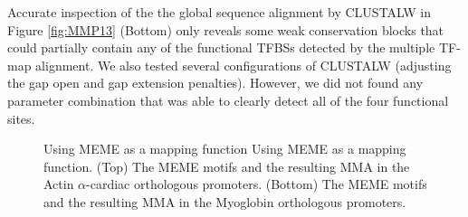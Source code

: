 Accurate inspection of the the global sequence alignment by CLUSTALW in Figure \ref{fig:MMP13} (Bottom)
only reveals some weak conservation blocks that could partially contain any of the functional 
TFBSs detected by the multiple TF-map alignment. We also tested several configurations of 
CLUSTALW (adjusting the gap open and gap extension penalties). However, we did not found any 
parameter combination that was able to clearly detect all of the four functional sites.

\begin{figure}[t!]
\begin{center}
\setlength{\fboxsep}{0pt}
          {Using MEME as a mapping function}%
          {Using MEME as a mapping function.}%
          {(Top) The MEME motifs and the resulting MMA in the Actin $\alpha$-cardiac orthologous promoters.
           (Bottom) The MEME motifs and the resulting MMA in the Myoglobin orthologous promoters.}
\end{center}
\end{figure}




{}
